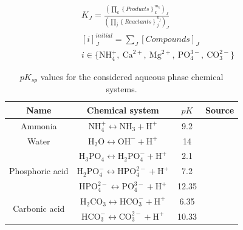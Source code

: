 \begin{refsection}[referencesCh3]
\begin{align} \label{eq:K_sp}
& K_{J} = \frac{ \left( \prod_{k} \left\{ Products \right\}_{k}^{m_{k}} \right)_{J}} { \left( \prod_{j} \left\{ Reactants \right\}_{j}^{n_{j}} \right)_{J}}&
\\
& \left[ i \right]_{J}^{initial} =  \sum_{J} \left[Compounds\right]_{J}  \label{eq:balance1}&
\\
& i \in \bigl\{{\text{NH}_{4}^{+}, \ \text{Ca}^{2+}, \ \text{Mg}^{2+}, \ \text{PO}_{4}^{3-}, \ \text{CO}_{3}^{2-}} \bigr\}  \nonumber&
\end{align}

\begin{table}[h] 
	\begin{adjustwidth}{}{}
		\centering
		\caption{$pK_{{sp}}$ values for the considered aqueous phase chemical systems.} \label{table:pK}
		\begin{tabular}{c c c c}
			\toprule
			Name	& Chemical system &${pK}$	&Source	\\ \midrule
			Ammonia & $\text{NH}_{4}^{+} \leftrightarrow \text{NH}_{3} + \text{H}^{+}$	&9.2 &\citep{Bates}	\\ 
			Water & $\text{H}_{2}\text{O} \leftrightarrow \text{OH}^{-} + \text{H}^{+}$	&14  &\citep{Skoog}	\\ 
			\multirow{3}{*}{Phosphoric acid} & $\text{H}_{3}\text{PO}_{4} \leftrightarrow \text{H}_{2}\text{PO}_{4}^{-} + \text{H}^{+}$	&2.1	&\citep{Ohlinger}	\\ 
			&$\text{H}_{2}\text{PO}_{4}^{-} \leftrightarrow \text{HPO}_{4}^{2-} + \text{H}^{+}$	&7.2  &\citep{Ohlinger}	\\ 
			&$\text{HPO}_{4}^{2-} \leftrightarrow \text{PO}_{4}^{3-} + \text{H}^{+}$	&12.35 &\citep{Ohlinger}	\\ 
			\multirow{2}{*}{Carbonic acid} & $\text{H}_{2}\text{CO}_{3} \leftrightarrow \text{HCO}_{3}^{-} + \text{H}^{+}$	&6.35	&\citep{Skoog}	\\  
			&$\text{HCO}_{3}^{-} \leftrightarrow \text{CO}_{3}^{2-} + \text{H}^{+}$	&10.33	&\citep{Skoog}	\\ \bottomrule
		\end{tabular}
	\end{adjustwidth}
\end{table}


\end{refsection}
